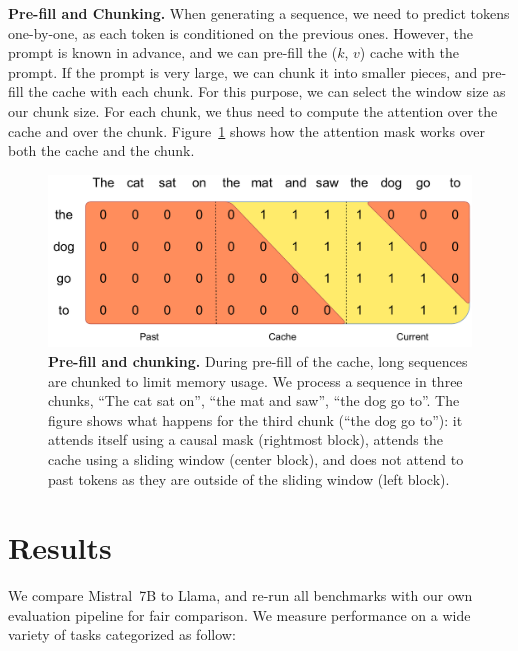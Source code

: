 \documentclass{article}
\def\llama{Llama\xspace}
\def\mistral{Mistral~7B\xspace}
\begin{document}
 \textbf{Pre-fill and Chunking.} When generating a sequence, we need to predict tokens one-by-one, as each token is conditioned on the previous ones. However, the prompt is known in advance, and we can pre-fill the ($k$, $v$) cache with the prompt. If the prompt is very large, we can chunk it into smaller pieces, and pre-fill the cache with each chunk. For this purpose, we can select the window size as our chunk size. 
For each chunk, we thus need to compute the attention over the cache and over the chunk. 
Figure~\ref{fig:chunking} shows how the attention mask works over both the cache and the chunk.


\begin{figure}[h]
\centering
\includegraphics[width=0.7\linewidth]{images/chunking.pdf} 
\caption{
\small
\textbf{Pre-fill and chunking.}
During pre-fill of the cache, long sequences are chunked to limit memory usage.
We process a sequence in three chunks, ``The cat sat on'', ``the mat and saw'', ``the dog go to''. 
The figure shows what happens for the third chunk (``the dog go to''): it attends itself using a causal mask (rightmost block), attends the cache using a sliding window (center block), and does not attend to past tokens as they are outside of the sliding window (left block).
}
\label{fig:chunking}
\vspace{0.1in}
\end{figure}

\section{Results}

We compare \mistral to \llama, and re-run all benchmarks with our own evaluation pipeline for fair comparison.
We measure performance on a wide variety of tasks categorized as follow:
\end{document}
